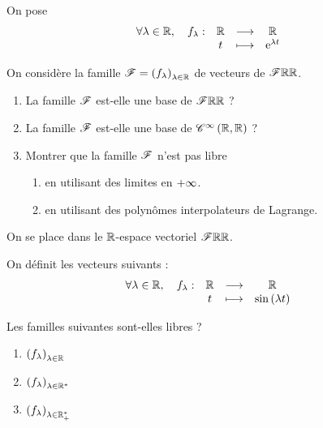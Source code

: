 \begin{corr}
\end{corr}

\begin{exo}
On pose \[\quantifs{\forall\lambda\in\R}\fonction{f_\lambda}{\R}{\R}{t}{\e{\lambda t}}\]

On considère la famille \(\mathscr{F}=\left(f_\lambda\right)_{\lambda\in\mathbb{R}}\) de vecteurs de \(\mathscr{F}{\mathbb{R}}{\mathbb{R}}\).

\begin{enumerate}
\item La famille \(\mathscr{F}\) est-elle une base de \(\mathscr{F}{\mathbb{R}}{\mathbb{R}}\) ? \\

\item La famille \(\mathscr{F}\) est-elle une base de \(\mathscr{C}^{\infty}\left(\mathbb{R},\mathbb{R}\right)\) ? \\

\item Montrer que la famille \(\mathscr{F}\) n'est pas libre

\begin{enumerate}
\item en utilisant des limites en \(+\infty\). \\

\item en utilisant des polynômes interpolateurs de Lagrange.
\end{enumerate}
\end{enumerate}
\end{exo}

\begin{corr}
\end{corr}

\begin{exo}
On se place dans le \(\mathbb{R}\)-espace vectoriel \(\mathscr{F}{\mathbb{R}}{\mathbb{R}}\).

On définit les vecteurs suivants : \[\quantifs{\forall\lambda\in\R}\fonction{f_\lambda}{\R}{\R}{t}{\sin\paren{\lambda t}}\]

Les familles suivantes sont-elles libres ?

\begin{enumerate}
\item \(\left(f_\lambda\right)_{\lambda\in\mathbb{R}}\) \\

\item \(\left(f_\lambda\right)_{\lambda\in\mathbb{R}^*}\) \\

\item \(\left(f_\lambda\right)_{\lambda\in\mathbb{R}_+^*}\)
\end{enumerate}
\end{exo}

